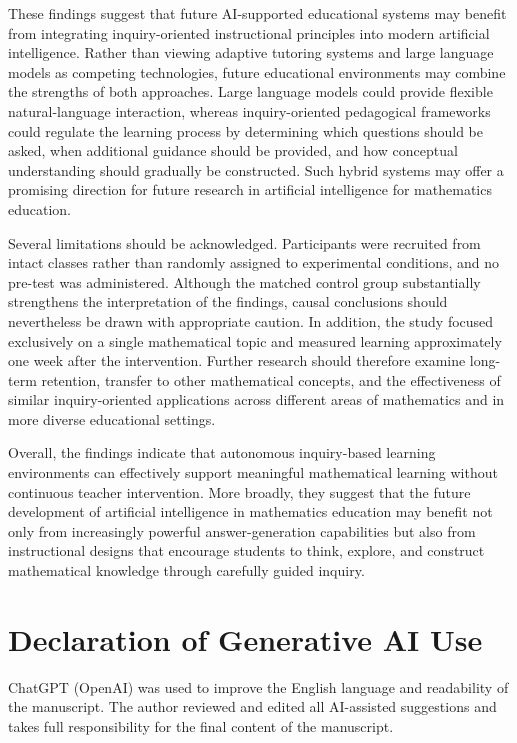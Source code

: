 \documentclass[11pt]{article}
\begin{document}
These findings suggest that future AI-supported educational systems may benefit from integrating inquiry-oriented instructional principles into modern artificial intelligence. Rather than viewing adaptive tutoring systems and large language models as competing technologies, future educational environments may combine the strengths of both approaches. Large language models could provide flexible natural-language interaction, whereas inquiry-oriented pedagogical frameworks could regulate the learning process by determining which questions should be asked, when additional guidance should be provided, and how conceptual understanding should gradually be constructed. Such hybrid systems may offer a promising direction for future research in artificial intelligence for mathematics education.

Several limitations should be acknowledged. Participants were recruited from intact classes rather than randomly assigned to experimental conditions, and no pre-test was administered. Although the matched control group substantially strengthens the interpretation of the findings, causal conclusions should nevertheless be drawn with appropriate caution. In addition, the study focused exclusively on a single mathematical topic and measured learning approximately one week after the intervention. Further research should therefore examine long-term retention, transfer to other mathematical concepts, and the effectiveness of similar inquiry-oriented applications across different areas of mathematics and in more diverse educational settings.

Overall, the findings indicate that autonomous inquiry-based learning environments can effectively support meaningful mathematical learning without continuous teacher intervention. More broadly, they suggest that the future development of artificial intelligence in mathematics education may benefit not only from increasingly powerful answer-generation capabilities but also from instructional designs that encourage students to think, explore, and construct mathematical knowledge through carefully guided inquiry.

\section*{Declaration of Generative AI Use}

ChatGPT (OpenAI) was used to improve the English language and readability of the manuscript. 
The author reviewed and edited all AI-assisted suggestions and takes full responsibility for the final content of the manuscript.


\end{document}
